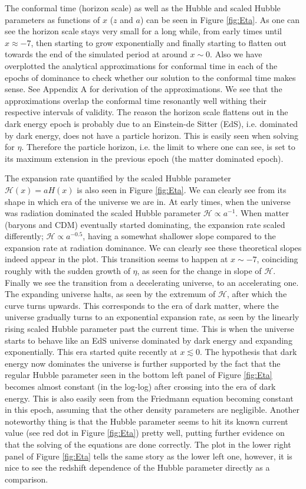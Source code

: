 \documentclass[twocolumn]{aastex62}
\begin{document}
The conformal time (horizon scale) as well as the Hubble
and scaled Hubble parameters as functions of $x$ ($z$ and $a$) can be seen in
Figure \ref{fig:Eta}. As one can see the horizon scale stays very small for a
long while, from early times until $x \approx -7$, then starting to grow
exponentially and finally starting to flatten out towards the end of the
simulated period at around $x\sim 0$. Also we have overplotted the analytical approximations for
conformal time in each of the epochs of dominance to check whether our solution
to the conformal time makes sense. See Appendix A for derivation of the
approximations. We see that the approximations overlap the conformal time
resonantly well withing their respective intervals of validity. The reason the horizon scale flattens out 
in the dark energy epoch is probably due to an Einstein-de Sitter (EdS), i.e. dominated by dark energy, does not have a particle horizon. 
This is easily seen when solving for $\eta$. Therefore the particle horizon, i.e. the limit to where one can see, is set to its
maximum extension in the previous epoch (the matter dominated epoch). 

The expansion rate quantified by the scaled Hubble parameter $\mathcal{H}(x) =
aH(x)$ is also seen in Figure \ref{fig:Eta}. We can clearly see from its shape
in which era of the universe we are in. At early times, when the universe was
radiation dominated the scaled Hubble parameter $\mathcal{H} \propto a^{-1}$.
When matter (baryons and CDM) eventually started dominating, the expansion rate
scaled differently; $\mathcal{H}\propto a^{-0.5}$, having a somewhat shallower
slope compared to the expansion rate at radiation dominance. We can clearly see these theoretical slopes indeed appear in the plot.
This transition
seems to happen at $x\sim -7$, coinciding roughly with the sudden growth of
$\eta$, as seen for the change in slope of $\mathcal{H}$. Finally we see the
transition from a decelerating universe, to an accelerating one. The expanding
universe halts, as seen by the extremum of $\mathcal{H}$, after which the curve
turns upwards. This corresponds to the era of dark matter, where the universe
gradually turns to an exponential expansion rate, as seen by the linearly rising scaled Hubble parameter past the current time.
This is when the universe starts to behave like an 
EdS universe dominated by dark energy and expanding exponentially.
This era started quite recently at $x\lesssim 0$. The hypothesis that dark energy now dominates the universe is further
supported by the fact that the regular Hubble parameter seen in the bottom left
panel of Figure \ref{fig:Eta} becomes almost constant (in the log-log) after
crossing into the era of dark energy. This is also easily seen from the Friedmann
equation becoming constant in this epoch, assuming that the other density parameters are negligible. Another
noteworthy thing is that the Hubble parameter seems to hit its known current
value (see red dot in Figure \ref{fig:Eta}) pretty well, putting further
evidence on that the solving of the equations are done correctly. The plot in the lower right
panel of Figure \ref{fig:Eta} tells the same story as the lower left one,
however, it is nice to see the redshift dependence of the Hubble
parameter directly as a comparison.
\end{document}
